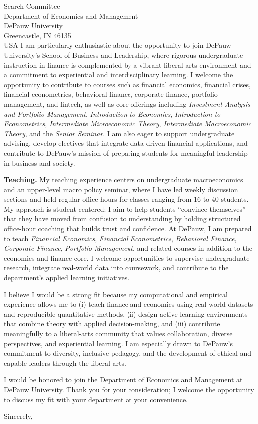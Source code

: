 \documentclass[11pt,letterpaper]{letter}
\begin{document}
\begin{letter}{Search Committee \\
Department of Economics and Management \\
DePauw University \\
Greencastle, IN 46135 \\ USA}
I am particularly enthusiastic about the opportunity to join DePauw University’s School of Business and Leadership, where rigorous undergraduate instruction in finance is complemented by a vibrant liberal-arts environment and a commitment to experiential and interdisciplinary learning. I welcome the opportunity to contribute to courses such as financial economics, financial crises, financial econometrics, behavioral finance, corporate finance, portfolio management, and fintech, as well as core offerings including \textit{Investment Analysis and Portfolio Management}, \textit{Introduction to Economics}, \textit{Introduction to Econometrics}, \textit{Intermediate Microeconomic Theory}, \textit{Intermediate Macroeconomic Theory}, and the \textit{Senior Seminar}. I am also eager to support undergraduate advising, develop electives that integrate data-driven financial applications, and contribute to DePauw’s mission of preparing students for meaningful leadership in business and society.

\textbf{Teaching.} My teaching experience centers on undergraduate macroeconomics and an upper-level macro policy seminar, where I have led weekly discussion sections and held regular office hours for classes ranging from 16 to 40 students. My approach is student-centered: I aim to help students “convince themselves” that they have moved from confusion to understanding by holding structured office-hour coaching that builds trust and confidence. At DePauw, I am prepared to teach \textit{Financial Economics}, \textit{Financial Econometrics}, \textit{Behavioral Finance}, \textit{Corporate Finance}, \textit{Portfolio Management}, and related courses in addition to the economics and finance core. I welcome opportunities to supervise undergraduate research, integrate real-world data into coursework, and contribute to the department’s applied learning initiatives.

I believe I would be a strong fit because my computational and empirical experience allows me to (i) teach finance and economics using real-world datasets and reproducible quantitative methods, (ii) design active learning environments that combine theory with applied decision-making, and (iii) contribute meaningfully to a liberal-arts community that values collaboration, diverse perspectives, and experiential learning. I am especially drawn to DePauw’s commitment to diversity, inclusive pedagogy, and the development of ethical and capable leaders through the liberal arts.

I would be honored to join the Department of Economics and Management at DePauw University. Thank you for your consideration; I welcome the opportunity to discuss my fit with your department at your convenience.

\closing{Sincerely,}

\end{letter}
\end{document}
